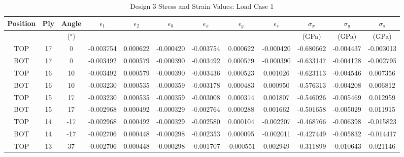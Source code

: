 


\begin{landscape}
\begin{table}
\centering
\caption{Design 3 Stress and Strain Values: Load Case 1}
\label{tab:q3stress1}
\begin{tabular}{|ccc|ccc|ccc|ccc|}
\toprule
Position &  Ply &  Angle & $\epsilon_{1}$ & $\epsilon_{2}$ & $\epsilon_{6}$ & $\epsilon_{x}$ & $\epsilon_{y}$ & $\epsilon_{s}$ & $\sigma_{x}$ & $\sigma_{y}$ & $\sigma_{s}$ \\
\midrule
 & & ($^{o}$) & & & & & & & (GPa) & (GPa) & (GPa) \\
\midrule
TOP &   17 &      0 & -0.003754 &  0.000622 & -0.000420 & -0.003754 &  0.000622 & -0.000420 &      -0.680662 &      -0.004437 &      -0.003013 \\
BOT &   17 &      0 & -0.003492 &  0.000579 & -0.000390 & -0.003492 &  0.000579 & -0.000390 &      -0.633147 &      -0.004128 &      -0.002795 \\
TOP &   16 &     10 & -0.003492 &  0.000579 & -0.000390 & -0.003436 &  0.000523 &  0.001026 &      -0.623113 &      -0.004546 &       0.007356 \\
BOT &   16 &     10 & -0.003230 &  0.000535 & -0.000359 & -0.003178 &  0.000483 &  0.000950 &      -0.576313 &      -0.004208 &       0.006812 \\
TOP &   15 &     17 & -0.003230 &  0.000535 & -0.000359 & -0.003008 &  0.000314 &  0.001807 &      -0.546026 &      -0.005469 &       0.012959 \\
BOT &   15 &     17 & -0.002968 &  0.000492 & -0.000329 & -0.002764 &  0.000288 &  0.001662 &      -0.501658 &      -0.005029 &       0.011915 \\
TOP &   14 &    -17 & -0.002968 &  0.000492 & -0.000329 & -0.002580 &  0.000104 & -0.002207 &      -0.468766 &      -0.006398 &      -0.015823 \\
BOT &   14 &    -17 & -0.002706 &  0.000448 & -0.000298 & -0.002353 &  0.000095 & -0.002011 &      -0.427449 &      -0.005832 &      -0.014417 \\
TOP &   13 &     37 & -0.002706 &  0.000448 & -0.000298 & -0.001707 & -0.000551 &  0.002949 &      -0.311899 &      -0.010643 &       0.021146 \\

\end{tabular}
\end{table}
\end{landscape}
